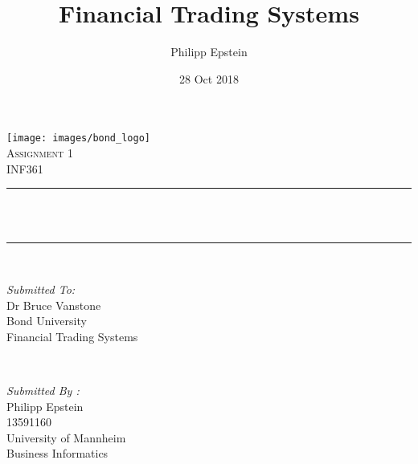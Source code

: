 \documentclass[a4paper, titlepage, 12pt]{article}
\title{Financial Trading Systems}								%
\author{Philipp Epstein}								%
\date{28 Oct 2018}											%
\makeatletter
\let\thetitle\@title
\makeatother
\begin{document}
	
	
	\begin{titlepage}
		\centering
		\vspace*{0.5 cm}
		\texttt{[image: images/bond\_logo]}\\[1.0 cm]	%
		\textsc{\LARGE Assignment 1}\\[2.0 cm]	%
		\textsc{\Large INF361}\\[0.5 cm]				%
		\rule{\linewidth}{0.2 mm} \\[0.4 cm]
		{ \huge \bfseries \thetitle}\\
		\rule{\linewidth}{0.2 mm} \\[1.5 cm]
		
		\begin{minipage}{0.4\textwidth}
			\begin{flushleft} \large
				\emph{Submitted To:}\\
				Dr Bruce Vanstone\\
				Bond University\\
				Financial Trading Systems\\
			\end{flushleft}
		\end{minipage}~
		\begin{minipage}{0.4\textwidth}
			
			\begin{flushright} \large
				\emph{Submitted By :} \\
				Philipp Epstein\\
				13591160\\
				University of Mannheim\\
				Business Informatics\\
			\end{flushright}
			
		\end{minipage}\\[2 cm]
		
	\end{titlepage}

	
\end{document}
